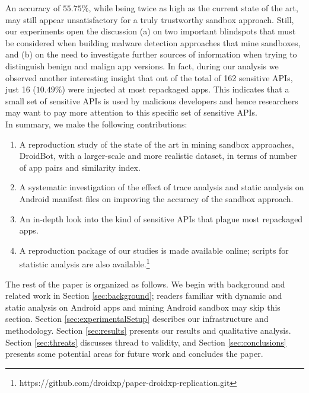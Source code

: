 An accuracy of $55.75\%$, while being twice as high as the current state of the art, may still appear unsatisfactory for a truly trustworthy sandbox approach. Still, 
our experiments open the discussion (a) on two important blindspots that must be considered when building 
malware detection approaches that mine sandboxes, and (b) on the need to investigate further sources of information when trying to distinguish benign and malign app versions. 
In fact, during our analysis we observed another interesting insight that out of the total of 162 sensitive 
APIs, just 16 ($10.49$\%) were injected at most repackaged apps. 
This indicates that a small set of sensitive APIs is used by malicious developers and hence 
researchers may want to pay more attention to this specific set of sensitive APIs.\\


\noindent
In summary, we make the following contributions:

\begin{enumerate}[1.]
\item A reproduction study of the state of the art in mining sandbox approaches, DroidBot, 
with a larger-scale and more realistic dataset, in terms of number of app pairs and similarity index.
\item A systematic investigation of the effect of trace analysis and static analysis on Android manifest files 
on improving the accuracy of the sandbox approach.
\item An in-depth look into the kind of sensitive APIs that plague most repackaged apps.
\item A reproduction package of our studies is made available online; scripts for statistic analysis are also available.\footnote{https://github.com/droidxp/paper-droidxp-replication.git}
\end{enumerate}


The rest of the paper is organized as follows. We begin with background and related work in Section \ref{sec:background};
readers familiar with dynamic and static analysis on Android apps and mining Android sandbox may skip this section.
Section \ref{sec:experimentalSetup} describes our infrastructure and methodology. Section \ref{sec:results} presents our results and qualitative analysis. Section \ref{sec:threats} discusses thread to validity, and Section \ref{sec:conclusions} 
presents some potential areas for future work and concludes the paper.




